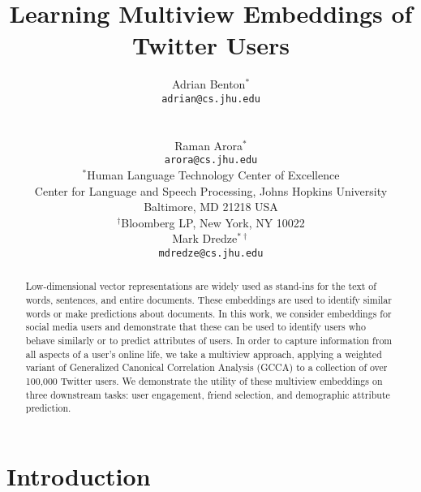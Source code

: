 \documentclass{article}
\begin{document}
 

\title{Learning Multiview Embeddings of Twitter Users}


\author{Adrian Benton$^*$ \\
  {\tt adrian@cs.jhu.edu} \\
  \\
  \\ \And
  Raman Arora$^*$ \\
  {\tt arora@cs.jhu.edu} \\
  $^*$Human Language Technology Center of Excellence\\
   Center for Language and Speech Processing, Johns Hopkins University\\
   Baltimore, MD 21218 USA \\
   $^{\dagger}$Bloomberg LP, New York, NY 10022\\
   \And
  Mark Dredze$^{* \dagger}$ \\
  {\tt mdredze@cs.jhu.edu}}


\date{}


\maketitle


\begin{abstract}
Low-dimensional vector representations are widely used as stand-ins for the text of words, sentences, and entire documents.
These embeddings are used to identify similar words or make predictions about documents.
In this work, we consider embeddings for social media users and demonstrate that these
can be used to identify users who behave similarly or to predict attributes of users.
In order to capture information from all aspects of a user's online life, we take a multiview approach,
applying a weighted variant of Generalized Canonical Correlation Analysis
(GCCA) to a collection of over 100,000 Twitter users.
We demonstrate the utility of these multiview embeddings on three downstream tasks: user engagement, friend selection, and 
demographic attribute prediction.
\end{abstract}

\section{Introduction}
\label{background}
\end{document}
